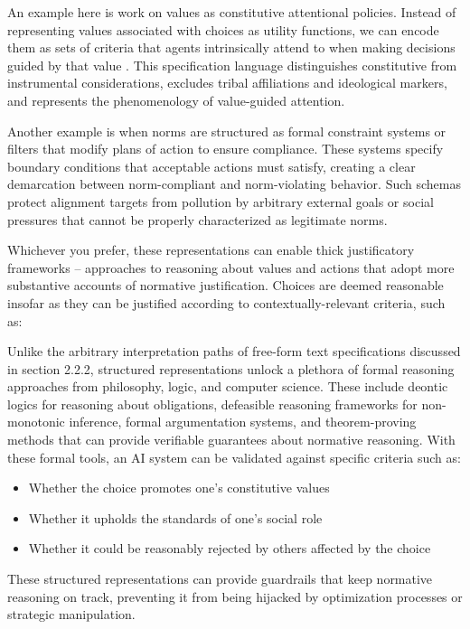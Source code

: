 An example here is work on values as constitutive attentional policies. Instead of representing values associated with choices as utility functions, we can encode them as sets of criteria that agents intrinsically attend to when making decisions guided by that value \cite{klingefjord2024}. This specification language distinguishes constitutive from instrumental considerations, excludes tribal affiliations and ideological markers, and represents the phenomenology of value-guided attention.

Another example is when norms are structured as formal constraint systems or filters that modify plans of action to ensure compliance. These systems specify boundary conditions that acceptable actions must satisfy, creating a clear demarcation between norm-compliant and norm-violating behavior. Such schemas protect alignment targets from pollution by arbitrary external goals or social pressures that cannot be properly characterized as legitimate norms.

Whichever you prefer, these representations can enable thick justificatory frameworks -- approaches to reasoning about values and actions that adopt more substantive accounts of normative justification. Choices are deemed reasonable insofar as they can be justified according to contextually-relevant criteria, such as:

Unlike the arbitrary interpretation paths of free-form text specifications discussed in section 2.2.2, structured representations unlock a plethora of formal reasoning approaches from philosophy, logic, and computer science. These include deontic logics for reasoning about obligations, defeasible reasoning frameworks for non-monotonic inference, formal argumentation systems, and theorem-proving methods that can provide verifiable guarantees about normative reasoning. With these formal tools, an AI system can be validated against specific criteria such as:

\begin{itemize}
\item Whether the choice promotes one's constitutive values
\item Whether it upholds the standards of one's social role
\item Whether it could be reasonably rejected by others affected by the choice
\end{itemize}

These structured representations can provide guardrails that keep normative reasoning on track, preventing it from being hijacked by optimization processes or strategic manipulation.

